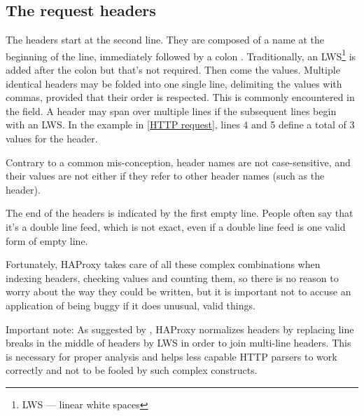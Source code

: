 
\subsection{The request headers}

The headers start at the second line. They are composed of a name at the
beginning of the line, immediately followed by a colon \CHAR{:}. Traditionally,
an LWS\footnote{LWS --- linear white spaces} is added after the colon but 
that's not required. Then come the values.
Multiple identical headers may be folded into one single line, delimiting the
values with commas, provided that their order is respected. This is commonly
encountered in the  field. A header may span over multiple lines if
the subsequent lines begin with an LWS. In the example in \autoref{HTTP request},
lines 4 and 5 define a total of 3 values for the  header.

Contrary to a common mis-conception, header names are not case-sensitive, and
their values are not either if they refer to other header names (such as the
 header).

The end of the headers is indicated by the first empty line. People often say
that it's a double line feed, which is not exact, even if a double line feed
is one valid form of empty line.

Fortunately, HAProxy takes care of all these complex combinations when indexing
headers, checking values and counting them, so there is no reason to worry
about the way they could be written, but it is important not to accuse an
application of being buggy if it does unusual, valid things.

Important note:
   As suggested by , HAProxy normalizes headers by replacing line breaks
   in the middle of headers by LWS in order to join multi-line headers. This
   is necessary for proper analysis and helps less capable HTTP parsers to work
   correctly and not to be fooled by such complex constructs.


